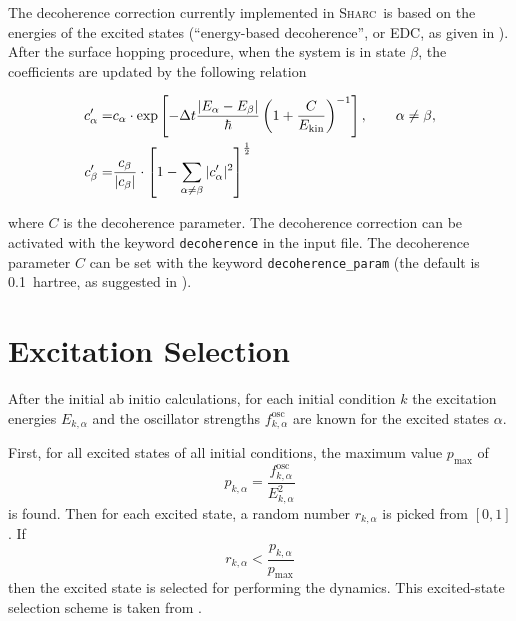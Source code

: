 \documentclass[a4paper,11pt,DIV=15,openany,twoside=false]{scrbook}
\newcommand{\tthdump}[1]{#1}
\newcommand{\sharc}{\textsc{Sharc}}
\newcommand{\ttt}[1]{\texttt{#1}}
\begin{document}
The decoherence correction currently implemented in \sharc\ is based on the energies of the excited states (``energy-based decoherence'', or EDC, as given in \cite{Granucci2010JCP}). After the surface hopping procedure, when the system is in state $\beta$, the coefficients are updated by the following relation
\tthdump{
  \begin{align}
    c_\alpha^\prime=&
    c_\alpha\cdot\exp
    \left[
      -\Delta t\frac{|E_\alpha-E_\beta|}{\hbar}
      \left(
        1+\frac{C}{E_{\text{kin}}}
      \right)^{-1}
    \right],\qquad \alpha\neq\beta,\\
    c_\beta^\prime=&
    \frac{c_\beta}{|c_\beta|}\cdot
    \left[
      1-\sum\limits_{\alpha\neq\beta}^{\vphantom{\alpha}} |c^\prime_\alpha|^2
    \right]^{\frac{1}{2}}
  \end{align}
}
where $C$ is the decoherence parameter. The decoherence correction can be activated with the keyword \ttt{decoherence} in the input file. The decoherence parameter $C$ can be set with the keyword \ttt{decoherence\_param} (the default is 0.1~hartree, as suggested in \cite{Granucci2010JCP}).


\section{Excitation Selection}\label{met:exc_selection}

After the initial ab initio calculations, for each initial condition $k$ the excitation energies $E_{k,\alpha}$ and the oscillator strengths $f^{\text{osc}}_{k,\alpha}$ are known for the excited states $\alpha$.

First, for all excited states of all initial conditions, the maximum value $p_{\text{max}}$ of 
\begin{equation}
  p_{k,\alpha}=\frac{f^{\text{osc}}_{k,\alpha}}{E_{k,\alpha}^2}
\end{equation}
is found. Then for each excited state, a random number $r_{k,\alpha}$ is picked from $[0,1]$. If
\begin{equation}
  r_{k,\alpha}<\frac{p_{k,\alpha}}{p_{\text{max}}}
\end{equation}
then the excited state is selected for performing the dynamics. This excited-state selection scheme is taken from \cite{Barbatti2011}.
\end{document}
